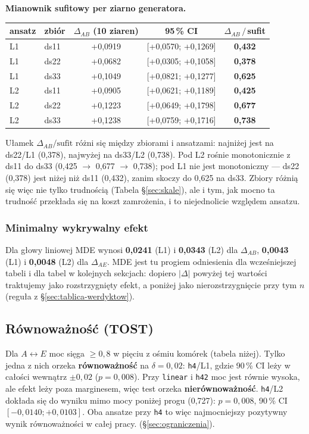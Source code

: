 \documentclass[11pt, a4paper]{article}
\begin{document}
\textbf{Mianownik sufitowy per ziarno generatora.}

\begin{table}[H]
\centering
\renewcommand{\arraystretch}{1.3}
\begin{tabular}{llccc}
\toprule
\textbf{ansatz} & \textbf{zbiór} & $\Delta_{AB}$ \textbf{(10 ziaren)} & \textbf{95\,\% CI} & $\Delta_{AB}\,/\,$\textbf{sufit} \\
\midrule
L1 & ds11 & +0,0919 & [+0,0570; +0,1269] & \textbf{0,432} \\
L1 & ds22 & +0,0682 & [+0,0305; +0,1058] & \textbf{0,378} \\
L1 & ds33 & +0,1049 & [+0,0821; +0,1277] & \textbf{0,625} \\
L2 & ds11 & +0,0905 & [+0,0621; +0,1189] & \textbf{0,425} \\
L2 & ds22 & +0,1223 & [+0,0649; +0,1798] & \textbf{0,677} \\
L2 & ds33 & +0,1238 & [+0,0759; +0,1716] & \textbf{0,738} \\
\bottomrule
\end{tabular}
\end{table}

Ułamek $\Delta_{AB}/\text{sufit}$ różni się między zbiorami i ansatzami: najniżej jest na ds22/L1 (0,378), najwyżej na ds33/L2 (0,738). Pod L2 rośnie monotonicznie z ds11 do ds33 (0,425 $\to$ 0,677 $\to$ 0,738); pod L1 nie jest monotoniczny --- ds22 (0,378) jest niżej niż ds11 (0,432), zanim skoczy do 0,625 na ds33. Zbiory różnią się więc nie tylko trudnością (Tabela \S\ref{sec:skale}), ale i tym, jak mocno ta trudność przekłada się na koszt zamrożenia, i to niejednolicie względem ansatzu.

\subsubsection{Minimalny wykrywalny efekt}
Dla głowy liniowej MDE wynosi \textbf{0,0241} (L1) i \textbf{0,0343} (L2) dla $\Delta_{AB}$, \textbf{0,0043} (L1) i \textbf{0,0048} (L2) dla $\Delta_{AE}$. MDE jest tu progiem odniesienia dla wcześniejszej tabeli i dla tabel w kolejnych sekcjach: dopiero $|\Delta|$ powyżej tej wartości traktujemy jako rozstrzygnięty efekt, a poniżej jako nierozstrzygnięcie przy tym $n$ (reguła z \S\ref{sec:tablica-werdyktow}).

\subsection{Równoważność (TOST)}
Dla $A\leftrightarrow E$ moc sięga $\ge 0{,}8$ w pięciu z ośmiu komórek (tabela niżej). Tylko jedna z nich orzeka \textbf{równoważność} na $\delta = 0{,}02$: \texttt{h4}/L1, gdzie 90\,\% CI leży w całości wewnątrz $\pm0{,}02$ ($p=0{,}008$). Przy \texttt{linear} i \texttt{h42} moc jest równie wysoka, ale efekt leży poza marginesem, więc test orzeka \textbf{nierównoważność}. \texttt{h4}/L2 dokłada się do wyniku mimo mocy poniżej progu (0,727): $p=0{,}008$, 90\,\% CI $[-0{,}0140;+0{,}0103]$. Oba ansatze przy \texttt{h4} to więc najmocniejszy pozytywny wynik równoważności w całej pracy. (\S\ref{sec:ograniczenia}).
\end{document}
